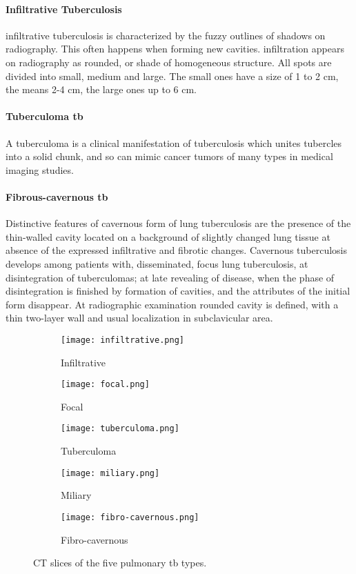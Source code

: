 \paragraph{Infiltrative Tuberculosis}
infiltrative tuberculosis is characterized by the fuzzy outlines of shadows on radiography. This often happens when forming new cavities. infiltration appears on radiography as rounded, or shade of homogeneous structure. All spots are divided into small, medium and large. The small ones have a size of 1 to 2 cm, the means 2-4 cm, the large ones up to 6 cm.\cite{TBINF:1}
\paragraph{Tuberculoma \ac{tb}}
A tuberculoma is a clinical manifestation of tuberculosis which unites tubercles into a solid chunk, and so can mimic cancer tumors of many types in medical imaging studies.\cite{TBTUM:1,TBTUM:2}
\paragraph{Fibrous-cavernous \ac{tb}}
Distinctive features of cavernous form of lung tuberculosis are the presence of the thin-walled cavity located on a background of slightly changed lung tissue at absence of the expressed infiltrative and fibrotic changes. Cavernous tuberculosis develops among patients with, disseminated, focus lung tuberculosis, at disintegration of tuberculomas; at late revealing of disease, when the phase of disintegration is finished by formation of cavities, and the attributes of the initial form disappear. At radiographic examination rounded cavity is defined, with a thin two-layer wall and usual localization in subclavicular area.\cite{TBFIB:1}
\begin{figure}[h!]
  \centering
  \begin{subfigure}[b]{0.3\linewidth}
    \texttt{[image: infiltrative.png]}
    \caption{Infiltrative}
  \end{subfigure}
  \begin{subfigure}[b]{0.3\linewidth}
    \texttt{[image: focal.png]}
    \caption{Focal}
  \end{subfigure}
  \begin{subfigure}[b]{0.3\linewidth}
    \texttt{[image: tuberculoma.png]}
    \caption{Tuberculoma}
  \end{subfigure}
  \begin{subfigure}[b]{0.3\linewidth}
    \texttt{[image: miliary.png]}
    \caption{Miliary}
  \end{subfigure}
  \begin{subfigure}[b]{0.3\linewidth}
    \texttt{[image: fibro-cavernous.png]}
    \caption{Fibro-cavernous}
  \end{subfigure}
  
  \caption{CT slices of the five pulmonary \ac{tb} types.\cite{ImageCLEF:1}}
  \label{fig:tb_types}
\end{figure}